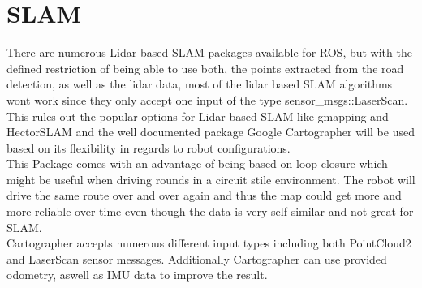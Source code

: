 \begin{table}[H]
\centering
{}
\label{dynlayerparams}
\caption{dynamic\_cost\_layer parameters}
\end{table}



\section{SLAM}
There are numerous Lidar based SLAM packages available for ROS, but with the defined restriction of being able to use both, the points extracted from the road detection, as well as the lidar data, most of the lidar based SLAM algorithms wont work since they only accept one input of  the type sensor\_msgs::LaserScan.\\
This rules out the popular options for Lidar based SLAM like gmapping and HectorSLAM and the well documented package Google Cartographer will be used based on its flexibility in regards to robot configurations.\\
This Package comes with an advantage of being based on loop closure which might be useful when driving rounds in a circuit stile environment. The robot will drive the same route over and over again and thus the map could get more and more reliable over time even though the data is very self similar and not great for SLAM.\\

Cartographer accepts numerous different input types including both PointCloud2 and LaserScan sensor messages. Additionally Cartographer can use provided odometry, aswell as IMU data to improve the result.\\








